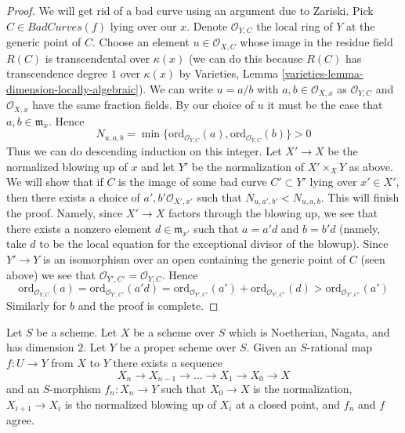 \begin{proof}
\medskip\noindent
We will get rid of a bad curve using an argument due to Zariski.
Pick $C \in BadCurves(f)$ lying over our $x$. Denote $\mathcal{O}_{Y, C}$
the local ring of $Y$ at the generic point of $C$. Choose an element
$u \in \mathcal{O}_{X, C}$ whose image in the residue field
$R(C)$ is transcendental over $\kappa(x)$ (we can do this because
$R(C)$ has transcendence degree $1$ over $\kappa(x)$ by
Varieties, Lemma \ref{varieties-lemma-dimension-locally-algebraic}).
We can write $u = a/b$ with $a, b \in \mathcal{O}_{X, x}$ as
$\mathcal{O}_{Y, C}$ and $\mathcal{O}_{X, x}$ have the same
fraction fields. By our choice of $u$ it must be the case that
$a, b \in \mathfrak m_x$. Hence
$$
N_{u, a, b} = \min
\{\text{ord}_{\mathcal{O}_{Y, C}}(a), \text{ord}_{\mathcal{O}_{Y, C}}(b)\} > 0
$$
Thus we can do descending induction on this integer.
Let $X' \to X$ be the normalized blowing up of $x$
and let $Y'$ be the normalization of $X' \times_X Y$ as above. We will
show that if $C$ is the image of some bad curve $C' \subset Y'$
lying over $x' \in X'$, then
there exists a choice of $a', b' \mathcal{O}_{X', x'}$
such that $N_{u, a', b'} < N_{u, a, b}$. This will finish the proof.
Namely, since $X' \to X$ factors through the blowing up, we see that
there exists a nonzero element $d \in \mathfrak m_{x'}$ such that
$a = a' d$ and $b = b' d$ (namely, take $d$ to be the local equation
for the exceptional divisor of the blowup). Since $Y' \to Y$
is an isomorphism over an open containing the generic point of $C$
(seen above) we see that $\mathcal{O}_{Y', C'} = \mathcal{O}_{Y, C}$.
Hence
$$
\text{ord}_{\mathcal{O}_{Y, C}}(a) =
\text{ord}_{\mathcal{O}_{Y', C'}}(a' d) =
\text{ord}_{\mathcal{O}_{Y', C'}}(a') +
\text{ord}_{\mathcal{O}_{Y', C'}}(d) >
\text{ord}_{\mathcal{O}_{Y', C'}}(a')
$$
Similarly for $b$ and the proof is complete.
\end{proof}

\begin{lemma}
\label{lemma-extend-rational-map-normalized-blowing-up}
Let $S$ be a scheme. Let $X$ be a scheme over $S$ which is
Noetherian, Nagata, and has dimension $2$. Let $Y$ be a proper
scheme over $S$. Given an $S$-rational map $f : U \to Y$ from
$X$ to $Y$ there exists a sequence
$$
X_n \to X_{n - 1} \to \ldots \to X_1 \to X_0 \to X
$$
and an $S$-morphism $f_n : X_n \to Y$ such that $X_0 \to X$ is the
normalization, $X_{i + 1} \to X_i$ is the normalized blowing up of
$X_i$ at a closed point, and $f_n$ and $f$ agree.
\end{lemma}

